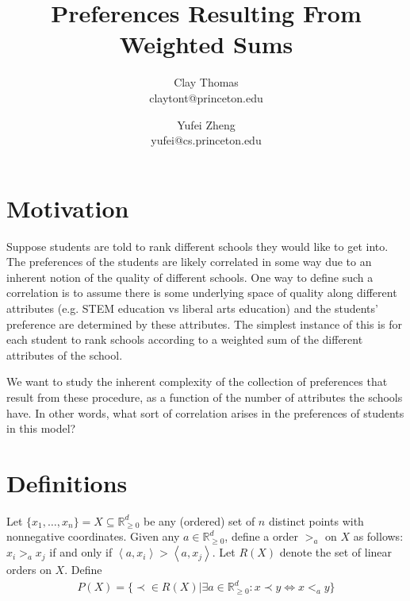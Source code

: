 \documentclass[12pt]{article}
\newcommand{\Rgz}{\mathbb{R}_{\ge 0}}
\newcommand{\ip}[2]{\left\langle{#1},{#2}\right\rangle}
\newcommand{\1}[1]{\mathds{1}[{#1}]}
\begin{document}
 
\title{Preferences Resulting From Weighted Sums}
\author{
  Clay Thomas \\
  claytont@princeton.edu
\and
  Yufei Zheng\\
  yufei@cs.princeton.edu
}

\maketitle

\section{Motivation}
  Suppose students are told to rank different schools they would like to
  get into. The preferences of the students are likely correlated in some
  way due to an inherent notion of the quality of different schools.
  One way to define such a correlation is to assume there is some underlying
  space of quality along different attributes (e.g. STEM education vs
  liberal arts education) and the students' preference
  are determined by these attributes.
  The simplest instance of this is for each student to rank schools
  according to a weighted sum of the different attributes of the school.

  We want to study the inherent complexity of the collection of preferences
  that result from these procedure, as a function of the number of attributes
  the schools have. In other words, what sort of correlation arises in the
  preferences of students in this model?


\section{Definitions}

  Let $\{x_1,\ldots,x_n\} = X\subseteq \Rgz^d$ be any (ordered) set of 
  $n$ distinct points with nonnegative coordinates.
  Given any $a\in \Rgz^d$, define a order $>_a$ on $X$ as follows:
  $x_i >_a x_j$ if and only if $\ip{a}{x_i} > \ip{a}{x_j}$.
  Let $R(X)$ denote the set of linear orders on $X$.
  Define
  \begin{align*}
    P(X) = \{ \prec \in R(X) | \exists a\in\Rgz^d: x \prec y \iff x <_a y\}
  \end{align*}
\end{document}
